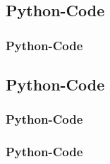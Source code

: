 \documentclass{beamer}
\theoremstyle{remark}
\numberwithin{equation}{section}
\begin{document}
\subsection{Python-Code}
\begin{frame}
\frametitle{Python-Code}

\end{frame}
\subsection{Python-Code}
\begin{frame}
\frametitle{Python-Code}

\end{frame}


\begin{frame}
\frametitle{Python-Code}

\end{frame}
\end{document}
